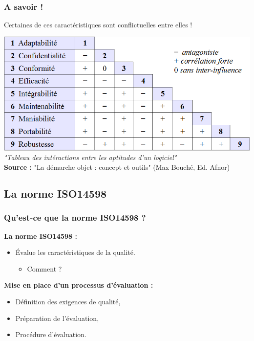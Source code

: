 \documentclass[10pt]{beamer}
\begin{document}
%
\begin{frame}
\frametitle{A savoir !}

   \pause[2] \begin{center}
	\alert{Certaines de ces caractéristiques sont conflictuelles entre elles !}
   \end{center}

\medskip

   \pause[3] \begin{center}
	\includegraphics[scale=0.4]{tableau.png} \\
	\textit{"Tableau des intéractions entre les aptitudes d'un logiciel"} \\
		\smallskip
	\tiny{\textbf{Source :} "La démarche objet : concept et outils" (Max Bouché, Ed. Afnor) }
   \end{center}

\end{frame}



\subsection{La norme ISO14598}
\begin{frame}
\frametitle{Qu'est-ce que la norme ISO14598 ?}
\pause[2] \textbf{La norme ISO14598 :}
\medskip
   \begin{itemize}
	\item<3-> \'Evalue les caractéristiques de la qualité.
\smallskip
		   \begin{itemize}
			\item<4->Comment ?
    		   \end{itemize}
    \end{itemize}

\bigskip

\pause[5] \textbf{Mise en place d'un processus d'évaluation :}
\smallskip
   \begin{itemize}
	\item<6-> Définition des exigences de qualité,
\smallskip
	\item<7-> Préparation de l'évaluation,
\smallskip
	\item<8-> Procédure d'évaluation.
    \end{itemize}
\end{frame}
\end{document}
